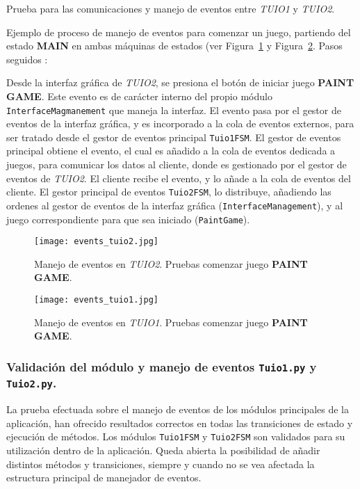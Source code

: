 Prueba para las comunicaciones y manejo de eventos entre \emph{TUIO1} y \emph{TUIO2}. 

Ejemplo de proceso de manejo de eventos para comenzar un juego, partiendo del estado \textbf{MAIN} en ambas máquinas de estados (ver Figura~\ref{fig:eventosTUIO2} y Figura~\ref{fig:eventosTUIO1}. 
Pasos seguidos :

Desde la interfaz gráfica de \emph{TUIO2}, se presiona el botón de iniciar juego \textbf{PAINT GAME}. Este evento es de carácter interno del propio módulo \texttt{InterfaceMagmanement} que maneja la interfaz.
El evento pasa por el gestor de eventos de la interfaz gráfica, y es incorporado a la cola de eventos externos, para ser tratado desde el gestor de eventos principal \texttt{Tuio1FSM}. 
El gestor de eventos principal obtiene el evento, el cual es añadido a la cola de eventos dedicada a juegos, para comunicar los datos al cliente, donde es gestionado por el gestor de eventos de \emph{TUIO2}.
El cliente recibe el evento, y lo añade a la cola de eventos del cliente. El gestor principal de eventos \texttt{Tuio2FSM}, lo distribuye, añadiendo las ordenes al gestor de eventos de la interfaz gráfica (\texttt{InterfaceManagement}), y al juego correspondiente para que sea iniciado (\texttt{PaintGame}).

\begin{figure}[!h]
\begin{center}
\texttt{[image: events\_tuio2.jpg]}
\caption{Manejo de eventos en \emph{TUIO2}. Pruebas comenzar juego \textbf{PAINT GAME}.}
\label{fig:eventosTUIO2}
\end{center}
\end{figure}

\begin{figure}[!h]
\begin{center}
\texttt{[image: events\_tuio1.jpg]}
\caption{Manejo de eventos en \emph{TUIO1}. Pruebas comenzar juego \textbf{PAINT GAME}.}
\label{fig:eventosTUIO1}
\end{center}
\end{figure}

\subsubsection{Validación del módulo y manejo de eventos \texttt{Tuio1.py} y \texttt{Tuio2.py}.}

La prueba efectuada sobre el manejo de eventos de los módulos principales de la aplicación, han ofrecido resultados correctos en todas las transiciones de estado y ejecución de métodos. Los módulos \texttt{Tuio1FSM} y \texttt{Tuio2FSM} son validados para su utilización dentro de la aplicación. Queda abierta la posibilidad de añadir distintos métodos y transiciones, siempre y cuando no se vea afectada la estructura principal de manejador de eventos.


